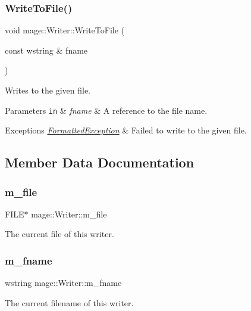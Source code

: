 \subsubsection{\texorpdfstring{Write\+To\+File()}{WriteToFile()}}
{\footnotesize\ttfamily void mage\+::\+Writer\+::\+Write\+To\+File (\begin{DoxyParamCaption}\item[{const wstring \&}]{fname }\end{DoxyParamCaption})}

Writes to the given file.


\begin{DoxyParams}[1]{Parameters}
\mbox{\tt in}  & {\em fname} & A reference to the file name. \\
\hline
\end{DoxyParams}

\begin{DoxyExceptions}{Exceptions}
{\em \hyperlink{structmage_1_1_formatted_exception}{Formatted\+Exception}} & Failed to write to the given file. \\
\hline
\end{DoxyExceptions}


\subsection{Member Data Documentation}
\hypertarget{classmage_1_1_writer_a04428b72245b50d45c62cbd23c2f039a}{}\label{classmage_1_1_writer_a04428b72245b50d45c62cbd23c2f039a} 
\subsubsection{\texorpdfstring{m\+\_\+file}{m\_file}}
{\footnotesize\ttfamily F\+I\+LE$\ast$ mage\+::\+Writer\+::m\+\_\+file\hspace{0.3cm}{\ttfamily [private]}}

The current file of this writer. \hypertarget{classmage_1_1_writer_afa271ee47897d4961e9d62132d8faeb5}{}\label{classmage_1_1_writer_afa271ee47897d4961e9d62132d8faeb5} 
\subsubsection{\texorpdfstring{m\+\_\+fname}{m\_fname}}
{\footnotesize\ttfamily wstring mage\+::\+Writer\+::m\+\_\+fname\hspace{0.3cm}{\ttfamily [private]}}

The current filename of this writer. 